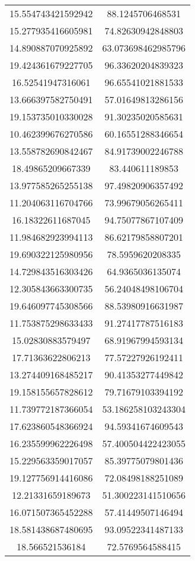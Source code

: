 \begin{table}
\begin{tabular}{cc}
15.554743421592942 & 88.1245706468531 \\
15.277935416605981 & 74.82630942848803 \\
14.890887070925892 & 63.073698462985796 \\
19.424361679227705 & 96.33620204839323 \\
16.52541947316061 & 96.65541021881533 \\
13.666397582750491 & 57.01649813286156 \\
19.153735010330028 & 91.30235020585631 \\
10.462399676270586 & 60.16551288346654 \\
13.558782690842467 & 84.91739002246788 \\
18.49865209667339 & 83.440611189853 \\
13.977585265255138 & 97.49820906357492 \\
11.204063116704766 & 73.99679056265411 \\
16.18322611687045 & 94.75077867107409 \\
11.984682923994113 & 86.62179858807201 \\
19.690322125980956 & 78.5959620208335 \\
14.729843516303426 & 64.9365036135074 \\
12.305843663300735 & 56.24048498106704 \\
19.646097745308566 & 88.53980916631987 \\
11.753875298633433 & 91.27417787516183 \\
15.02830883579497 & 68.91967994593134 \\
17.71363622806213 & 77.57227926192411 \\
13.274409168485217 & 90.41353277449842 \\
19.158155657828612 & 79.71679103394192 \\
11.739772187366054 & 53.186258103243304 \\
17.623860548366924 & 94.59341674609543 \\
16.235599962226498 & 57.400504422423055 \\
15.229563359017057 & 85.39775079801436 \\
19.127756914416086 & 72.08498188251089 \\
12.21331659189673 & 51.300223141510656 \\
16.071507365452288 & 57.41449507146494 \\
18.581438687480695 & 93.09522341487133 \\
18.566521536184 & 72.5769564588415 \\

\end{tabular}
\end{table}
